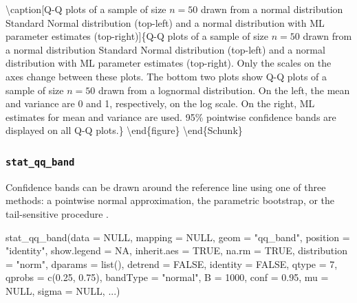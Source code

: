 \textbackslash{}caption{[}Q-Q plots of a sample of size \(n=50\) drawn
from a normal distribution Standard Normal distribution (top-left) and a
normal distribution with ML parameter estimates (top-right){]}\{Q-Q
plots of a sample of size \(n=50\) drawn from a normal distribution
Standard Normal distribution (top-left) and a normal distribution with
ML parameter estimates (top-right). Only the scales on the axes change
between these plots. The bottom two plots show Q-Q plots of a sample of
size \(n=50\) drawn from a lognormal distribution. On the left, the mean
and variance are 0 and 1, respectively, on the log scale. On the right,
ML estimates for mean and variance are used. 95\% pointwise confidence
bands are displayed on all Q-Q plots.\}\label{fig:qqline}
\textbackslash{}end\{figure\} \textbackslash{}end\{Schunk\}

\subsubsection{\texorpdfstring{\texttt{stat\_qq\_band}}{stat\_qq\_band}}\label{stat_qq_band}

Confidence bands can be drawn around the reference line using one of
three methods: a pointwise normal approximation, the parametric
bootstrap, or the tail-sensitive procedure \citep{Aldor-Noiman2013-xw}.

\begin{Schunk}
\begin{Sinput}
stat_qq_band(data = NULL,
             mapping = NULL,
             geom = "qq_band",
             position = "identity",
             show.legend = NA,
             inherit.aes = TRUE,
             na.rm = TRUE,
             distribution = "norm",
             dparams = list(),
             detrend = FALSE,
             identity = FALSE,
             qtype = 7,
             qprobs = c(0.25, 0.75),
             bandType = "normal",
             B = 1000,
             conf = 0.95,
             mu = NULL,
             sigma = NULL,
             ...)
\end{Sinput}
\end{Schunk}

